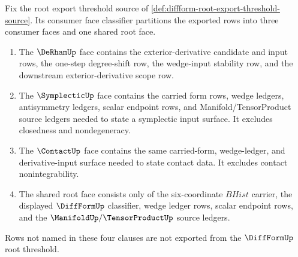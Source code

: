 \begin{definition}
\label{def:diffform-root-consumer-face-classifier}
Fix the root export threshold source of
\autoref{def:diffform-root-export-threshold-source}. Its consumer face
classifier partitions the exported rows into three consumer faces and one
shared root face.
\begin{enumerate}
  \item The $\DeRhamUp$ face contains the exterior-derivative candidate and
  input rows, the one-step degree-shift row, the wedge-input stability row, and
  the downstream exterior-derivative scope row.
  \item The $\SymplecticUp$ face contains the carried form rows, wedge ledgers,
  antisymmetry ledgers, scalar endpoint rows, and Manifold/TensorProduct source
  ledgers needed to state a symplectic input surface. It excludes closedness and
  nondegeneracy.
  \item The $\ContactUp$ face contains the same carried-form, wedge-ledger, and
  derivative-input surface needed to state contact data. It excludes contact
  nonintegrability.
  \item The shared root face consists only of the six-coordinate $BHist$
  carrier, the displayed $\DiffFormUp$ classifier, wedge ledger rows, scalar
  endpoint rows, and the $\ManifoldUp/\TensorProductUp$ source ledgers.
\end{enumerate}
Rows not named in these four clauses are not exported from the
$\DiffFormUp$ root threshold.
\end{definition}

